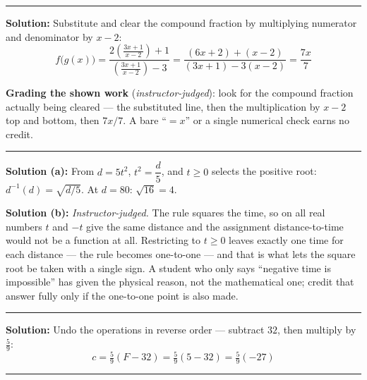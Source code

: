 \documentclass[12pt]{article}
\begin{document}
\vspace{0.1cm}\noindent\rule{\linewidth}{0.2pt}


\textbf{Solution:} Substitute and clear the compound fraction by multiplying numerator and denominator by $x - 2$:
\[ f\bigl(g(x)\bigr)
   = \frac{2\left(\frac{3x+1}{x-2}\right) + 1}{\left(\frac{3x+1}{x-2}\right) - 3}
   = \frac{(6x + 2) + (x - 2)}{(3x + 1) - 3(x - 2)}
   = \frac{7x}{7} \]

\textbf{Grading the shown work} (\emph{instructor-judged}): look for the compound fraction actually being cleared --- the substituted line, then the multiplication by $x - 2$ top and bottom, then $7x/7$. A bare ``$= x$'' or a single numerical check earns no credit.

\vspace{0.1cm}\noindent\rule{\linewidth}{0.2pt}


\textbf{Solution (a):} From $d = 5t^{2}$, $t^{2} = \dfrac{d}{5}$, and $t \geq 0$ selects the positive root: $d^{-1}(d) = \sqrt{d/5}$. At $d = 80$: $\sqrt{16} = 4$. 

\textbf{Solution (b):} \emph{Instructor-judged.} The rule squares the time, so on all real numbers $t$ and $-t$ give the same distance and the assignment distance-to-time would not be a function at all. Restricting to $t \geq 0$ leaves exactly one time for each distance --- the rule becomes one-to-one --- and that is what lets the square root be taken with a single sign. A student who only says ``negative time is impossible'' has given the physical reason, not the mathematical one; credit that answer fully only if the one-to-one point is also made.

\vspace{0.1cm}\noindent\rule{\linewidth}{0.2pt}


\textbf{Solution:} Undo the operations in reverse order --- subtract $32$, then multiply by $\tfrac{5}{9}$:
\[ c = \tfrac{5}{9}(F - 32) = \tfrac{5}{9}(5 - 32) = \tfrac{5}{9}(-27) \]

\vspace{0.1cm}\noindent\rule{\linewidth}{0.2pt}
\end{document}
